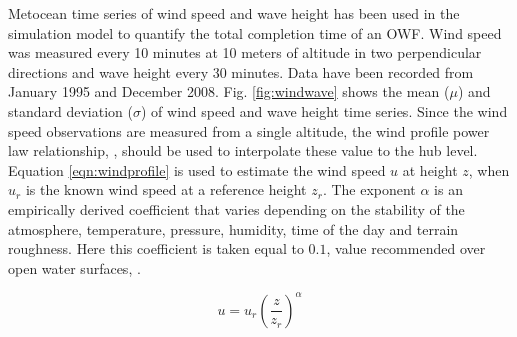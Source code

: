 Metocean time series of wind speed and wave height has been used in the simulation model to quantify the total completion time of an OWF. Wind speed was measured every 10 minutes at 10 meters of altitude in two perpendicular directions and wave height every 30 minutes. Data have been recorded from January 1995 and December 2008.
Fig. \ref{fig:windwave} shows the mean ($\mu$) and standard deviation ($\sigma$) of wind speed and wave height time series.
Since the wind speed observations are measured from a single altitude, the wind profile power law relationship, \cite{Justus_1976, 1978Peterson}, should be used to interpolate these value to the hub level. Equation \ref{eqn:windprofile} is used to estimate the wind speed $u$ at height $z$, when $u_{r}$ is the known wind speed at a reference height $z_{r}$. The exponent $\alpha$ is an empirically derived coefficient that varies depending on the stability of the atmosphere, temperature, pressure, humidity, time of the day and terrain roughness. Here this coefficient is taken equal to $0.1$, value recommended over open water surfaces, \cite{WindEnergy2010}.

\begin{equation}
\label{eqn:windprofile}
u = u_{r} \left( \frac{z}{z_r} \right)^{\alpha}
\end{equation}